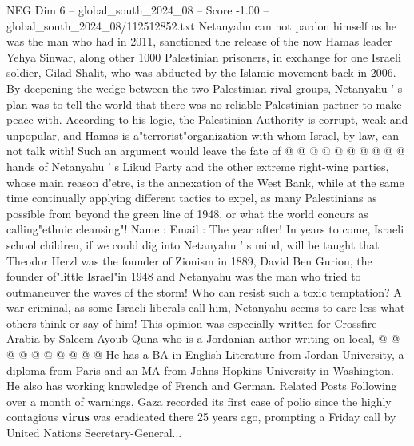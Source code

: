 \begin{textsample}{NEG Dim 6 – global\_south\_2024\_08 – Score -1.00 – global\_south\_2024\_08/112512852.txt}
Netanyahu can not pardon himself as he was the man who had in 2011, sanctioned the release of the now Hamas leader Yehya Sinwar, along other 1000 Palestinian prisoners, in exchange for one Israeli soldier, Gilad Shalit, who was abducted by the Islamic movement back in 2006.
By deepening the wedge between the two Palestinian rival groups, Netanyahu ' s plan was to tell the world that there was no reliable Palestinian partner to make peace with.
According to his logic, the Palestinian Authority is corrupt, weak and unpopular, and Hamas is a"terrorist"organization with whom Israel, by law, can not talk with!
Such an argument would leave the fate of @ @ @ @ @ @ @ @ @ @ hands of Netanyahu ' s Likud Party and the other extreme right-wing parties, whose main reason d'etre, is the annexation of the West Bank, while at the same time continually applying different tactics to expel, as many Palestinians as possible from beyond the green line of 1948, or what the world concurs as calling"ethnic cleansing"!
Name : Email : The year after!
In years to come, Israeli school children, if we could dig into Netanyahu ' s mind, will be taught that Theodor Herzl was the founder of Zionism in 1889, David Ben Gurion, the founder of"little Israel"in 1948 and Netanyahu was the man who tried to outmaneuver the waves of the storm!
Who can resist such a toxic temptation?
A war criminal, as some Israeli liberals call him, Netanyahu seems to care less what others think or say of him!
This opinion was especially written for Crossfire Arabia by Saleem Ayoub Quna who is a Jordanian author writing on local, @ @ @ @ @ @ @ @ @ @ He has a BA in English Literature from Jordan University, a diploma from Paris and an MA from Johns Hopkins University in Washington.
He also has working knowledge of French and German.
Related Posts Following over a month of warnings, Gaza recorded its first case of polio since the highly contagious \textbf{virus} was eradicated there 25 years ago, prompting a Friday call by United Nations Secretary-General...

\end{textsample}
